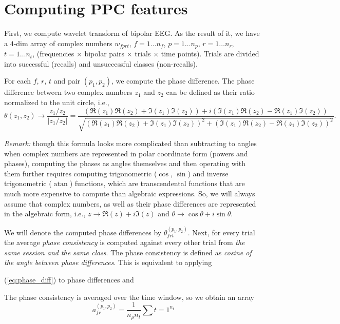 \documentclass[a4paper]{article}
\DeclareMathOperator{\atan}{atan}
\begin{document}
\section*{Computing PPC features}

First, we compute wavelet transform of bipolar EEG. As the result of it, we have a $4$-dim
array of complex numbers $w_{fprt}$, $f = 1 \ldots n_f$, $p = 1 \ldots n_p$, $r = 1 \ldots n_r$,
$t = 1 \ldots n_t$, (frequencies $\times$ bipolar pairs $\times$ trials $\times$ time points).
Trials are divided into successful (recalls) and unsuccessful classes (non-recalls).

For each $f$, $r$, $t$ and pair $(p_1,p_2)$, we compute the phase difference. The phase
difference between two complex numbers $z_1$ and $z_2$ can be defined as their ratio normalized
to the unit circle, i.e.,
\begin{equation}
\label{eq:phase_diff}
\theta(z_1,z_2) \to \frac{z_1/z_2}{|z_1/z_2|} = \frac{\left(\Re(z_1) \Re(z_2) + \Im(z_1) \Im(z_2)\right) + i \left(\Im(z_1) \Re(z_2) - \Re(z_1) \Im(z_2)\right)}{\sqrt{\left(\Re(z_1) \Re(z_2) + \Im(z_1) \Im(z_2)\right)^2 + \left(\Im(z_1) \Re(z_2) - \Re(z_1) \Im(z_2)\right)^2}}.
\end{equation}

{\em Remark:} though this formula looks more complicated than subtracting to angles when
complex numbers are represented in polar coordinate form (powers and phases), computing
the phases as angles themselves and then operating with them further requires computing
trigonometric ($\cos$, $\sin$) and inverse trigonometric ($\atan$) functions, which are
transcendental functions that are much more expensive to compute than algebraic expressions.
So, we will always assume that complex numbers, as well as their phase differences are
represented in the algebraic form, i.e., $z \to \Re(z) + i \Im(z)$ and
$\theta \to \cos\theta + i \sin\theta$.

We will denote the computed phase differences by $\theta_{frt}^{(p_1,p_2)}$. Next, for every
trial the average {\em phase consistency\/} is computed against every other trial from
{\em the same session and the same class\/}. The phase consistency is defined as
{\em cosine of the angle between phase differences\/}. This is equivalent to applying


(\ref{eq:phase_diff}) to phase differences and 


The phase consistency is averaged over
the time window, so we obtain an array
\[a_{fr}^{(p_1,p_2)} = \frac{1}{n_{\rho} n_t} \sum{t=1}^{n_t}  \]
\end{document}
